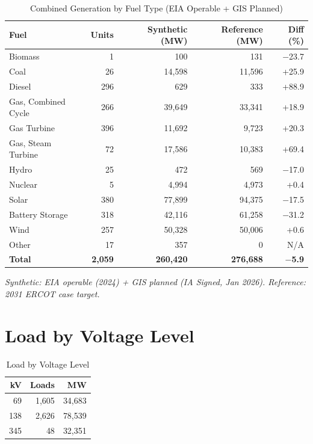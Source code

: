 \documentclass[11pt]{article}
\begin{document}
\begin{table}[H]
\centering
\caption{Combined Generation by Fuel Type (EIA Operable + GIS Planned)}
\begin{tabular}{lrrrr}
\toprule
\textbf{Fuel} & \textbf{Units} & \textbf{Synthetic (MW)} & \textbf{Reference (MW)} & \textbf{Diff (\%)} \\
\midrule
Biomass              & 1   & 100    & 131    & $-$23.7 \\
Coal                 & 26  & 14,598 & 11,596 & +25.9 \\
Diesel               & 296 & 629    & 333    & +88.9 \\
Gas, Combined Cycle  & 266 & 39,649 & 33,341 & +18.9 \\
Gas Turbine          & 396 & 11,692 & 9,723  & +20.3 \\
Gas, Steam Turbine   & 72  & 17,586 & 10,383 & +69.4 \\
Hydro                & 25  & 472    & 569    & $-$17.0 \\
Nuclear              & 5   & 4,994  & 4,973  & +0.4 \\
Solar                & 380 & 77,899 & 94,375 & $-$17.5 \\
Battery Storage      & 318 & 42,116 & 61,258 & $-$31.2 \\
Wind                 & 257 & 50,328 & 50,006 & +0.6 \\
Other                & 17  & 357    & 0      & N/A \\
\midrule
\textbf{Total}       & \textbf{2,059} & \textbf{260,420} & \textbf{276,688} & \textbf{$-$5.9} \\
\bottomrule
\end{tabular}
\end{table}

\noindent\textit{Synthetic: EIA operable (2024) + GIS planned (IA Signed, Jan 2026). Reference: 2031 ERCOT case target.}

\section{Load by Voltage Level}

\begin{table}[H]
\centering
\caption{Load by Voltage Level}
\begin{tabular}{rrr}
\toprule
\textbf{kV} & \textbf{Loads} & \textbf{MW} \\
\midrule
69  & 1,605 & 34,683 \\
138 & 2,626 & 78,539 \\
345 & 48    & 32,351 \\
\bottomrule
\end{tabular}
\end{table}
\end{document}
